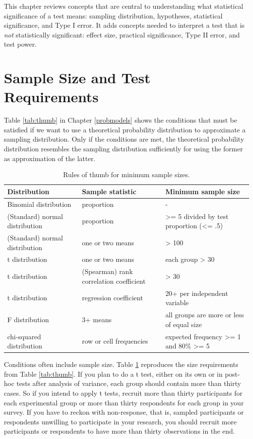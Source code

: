 \documentclass[a4paper]{book}
\theoremstyle{definition}
\theoremstyle{definition}
\theoremstyle{definition}
\theoremstyle{remark}
\begin{document}
This chapter reviews concepts that are central to understanding what
statistical significance of a test means: sampling distribution,
hypotheses, statistical significance, and Type I error. It adds concepts
needed to interpret a test that is \emph{not} statistically significant:
effect size, practical significance, Type II error, and test power.

\section{Sample Size and Test Requirements}\label{size-test-req}

Table \ref{tab:thumb} in Chapter \ref{probmodels} shows the conditions
that must be satisfied if we want to use a theoretical probability
distribution to approximate a sampling distribution. Only if the
conditions are met, the theoretical probability distribution resembles
the sampling distribution sufficiently for using the former as
approximation of the latter.

\begin{table}[H]

\caption{\label{tab:thumbsize}Rules of thumb for minimum sample sizes.}
\centering
\fontsize{8}{8}\selectfont
\begin{tabular}[t]{p{4cm}p{4cm}p{4cm}}
\hline
Distribution & Sample statistic & Minimum sample size\\
\hline
Binomial distribution & proportion & -\\
(Standard) normal distribution & proportion & >= 5 divided by test proportion (<= .5)\\
(Standard) normal distribution & one or two means & > 100\\
t distribution & one or two means & each group > 30\\
t distribution & (Spearman) rank correlation coefficient & > 30\\
t distribution & regression coefficient & 20+ per independent variable\\
F distribution & 3+ means & all groups are more or less of equal size\\
chi-squared distribution & row or cell frequencies & expected frequency >= 1 and 80\% >= 5\\
\hline
\end{tabular}
\end{table}

Conditions often include sample size. Table \ref{tab:thumbsize}
reproduces the size requirements from Table \ref{tab:thumb}. If you plan
to do a t test, either on its own or in post-hoc tests after analysis of
variance, each group should contain more than thirty cases. So if you
intend to apply t tests, recruit more than thirty participants for each
experimental group or more than thirty respondents for each group in
your survey. If you have to reckon with non-response, that is, sampled
participants or respondents unwilling to participate in your research,
you should recruit more participants or respondents to have more than
thirty observations in the end.
\end{document}
